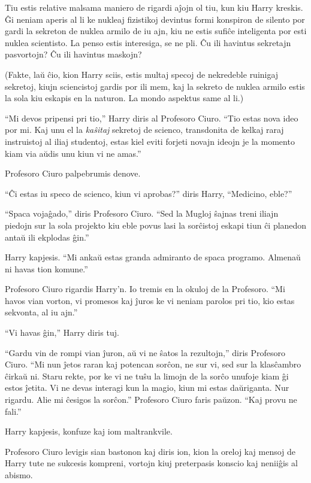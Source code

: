 Tiu estis relative malsama maniero de rigardi aĵojn ol tiu, kun kiu
Harry kreskis. Ĝi neniam aperis al li ke nukleaj fizistikoj devintus
formi konspiron de silento por gardi la sekreton de nuklea armilo de
iu ajn, kiu ne estis sufiĉe inteligenta por esti nuklea scientisto. La
penso estis interesiga, se ne pli. Ĉu ili havintus sekretajn
pasvortojn? Ĉu ili havintus maskojn?


(Fakte, laŭ ĉio, kion Harry sciis, estis multaj specoj de nekredeble
ruinigaj sekretoj, kiujn sciencistoj gardis por ili mem, kaj la
sekreto de nuklea armilo estis la sola kiu eskapis en la naturon. La
mondo aspektus same al li.)

``Mi devos pripensi pri tio,'' Harry diris al Profesoro Ciuro. ``Tio
estas nova ideo por mi. Kaj unu el la \emph{kaŝitaj} sekretoj de
scienco, transdonita de kelkaj raraj instruistoj al iliaj studentoj,
estas kiel eviti forjeti novajn ideojn je la momento kiam via aŭdis
unu kiun vi ne amas.''


Profesoro Ciuro palpebrumis denove.

``Ĉi estas iu speco de scienco, kiun vi aprobas?'' diris Harry,
``Medicino, eble?''

``Spaca vojaĝado,'' diris Profesoro Ciuro. ``Sed la Mugloj ŝajnas
treni iliajn piedojn sur la sola projekto kiu eble povus lasi la
sorĉistoj eskapi tiun ĉi planedon antaŭ ili ekplodas ĝin.''

Harry kapjesis. ``Mi ankaŭ estas granda admiranto de spaca
programo. Almenaŭ ni havas tion komune.''

Profesoro Ciuro rigardis Harry'n. Io tremis en la okuloj de la
Profesoro. ``Mi havos vian vorton, vi promesos kaj ĵuros ke vi neniam
parolos pri tio, kio estas sekvonta, al iu ajn.''

``Vi havas ĝin,'' Harry diris tuj.

``Gardu vin de rompi vian ĵuron, aŭ vi ne ŝatos la rezultojn,'' diris
Profesoro Ciuro. ``Mi nun ĵetos raran kaj potencan sorĉon, ne sur vi,
sed sur la klasĉambro ĉirkaŭ ni. Staru rekte, por ke vi ne tuŝu la
limojn de la sorĉo unufoje kiam ĝi estos ĵetita. Vi ne devas interagi
kun la magio, kiun mi estas daŭriganta. Nur rigardu. Alie mi ĉesigos
la sorĉon.'' Profesoro Ciuro faris paŭzon. ``Kaj provu ne fali.''

Harry kapjesis, konfuze kaj iom maltrankvile.

Profesoro Ciuro levigis sian bastonon kaj diris ion, kion la oreloj
kaj mensoj de Harry tute ne sukcesis kompreni, vortojn kiuj
preterpasis konscio kaj neniiĝis al abismo.


